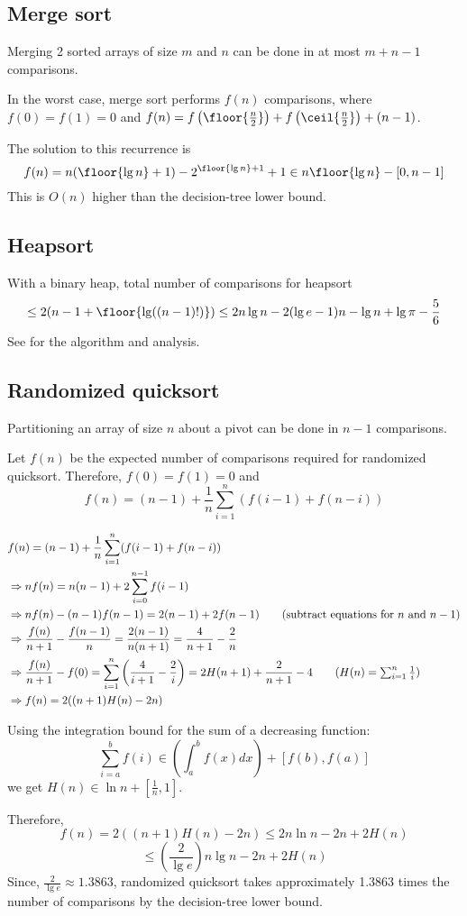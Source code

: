 \subsection{Merge sort}

Merging 2 sorted arrays of size $m$ and $n$ can be done in at most $m + n - 1$ comparisons.

In the worst case, merge sort performs $f(n)$ comparisons, where
$f(0) = f(1) = 0$ and
$f(n) = f\left(\floor{\frac{n}{2}}\right) + f\left(\ceil{\frac{n}{2}}\right) + (n-1)$.

The solution to this recurrence is \cite{eku-notes-recurrences}
\[ f(n)
= n(\floor{\lg n} + 1) - 2^{\floor{\lg n} + 1} + 1
\in n\floor{\lg n} - [0, n-1] \]
This is $O(n)$ higher than the decision-tree lower bound.

\subsection{Heapsort}

With a binary heap, total number of comparisons for heapsort
\[ \le 2(n-1 + \floor{\lg((n-1)!)}) \le 2n\lg n - 2(\lg e - 1)n - \lg n + \lg\pi - \frac{5}{6} \]
See \cite{eku-notes-heaps} for the algorithm and analysis.

\subsection{Randomized quicksort}

Partitioning an array of size $n$ about a pivot can be done in $n-1$ comparisons.

Let $f(n)$ be the expected number of comparisons required for randomized quicksort.
Therefore, $f(0) = f(1) = 0$ and
\[ f(n) = (n-1) + \frac{1}{n} \sum_{i=1}^n (f(i-1) + f(n-i)) \]

\begin{align*}
& f(n) = (n-1) + \frac{1}{n} \sum_{i=1}^n (f(i-1) + f(n-i))
\\ &\Rightarrow nf(n) = n(n-1) + 2 \sum_{i=0}^{n-1} f(i-1)
\\ &\Rightarrow nf(n) - (n-1)f(n-1) = 2(n-1) + 2f(n-1) \tag{subtract equations for $n$ and $n-1$}
\\ &\Rightarrow \frac{f(n)}{n+1} - \frac{f(n-1)}{n}
= \frac{2(n-1)}{n(n+1)} = \frac{4}{n+1} - \frac{2}{n}
\\ &\Rightarrow \frac{f(n)}{n+1} - f(0)
= \sum_{i=1}^n \left( \frac{4}{i+1} - \frac{2}{i} \right)
= 2H(n+1) + \frac{2}{n+1} - 4 \tag{$H(n) = \sum_{i=1}^n \frac{1}{i}$}
\\ &\Rightarrow f(n) = 2((n+1)H(n) - 2n)
\end{align*}

Using the integration bound for the sum of a decreasing function:
\[ \sum_{i=a}^b f(i) \in \left( \int_a^b f(x)dx \right) + [f(b), f(a)] \]
we get $H(n) \in \ln n + \left[ \frac{1}{n}, 1 \right]$.

Therefore,
\[ f(n) = 2((n+1)H(n) - 2n) \le 2n\ln n - 2n + 2H(n) \]
\[ \le \left(\frac{2}{\lg e}\right)n\lg n - 2n + 2H(n) \]
Since, $\frac{2}{\lg e} \approx 1.3863$, randomized quicksort takes
approximately 1.3863 times the number of comparisons by the decision-tree lower bound.

\addMyBib{}



